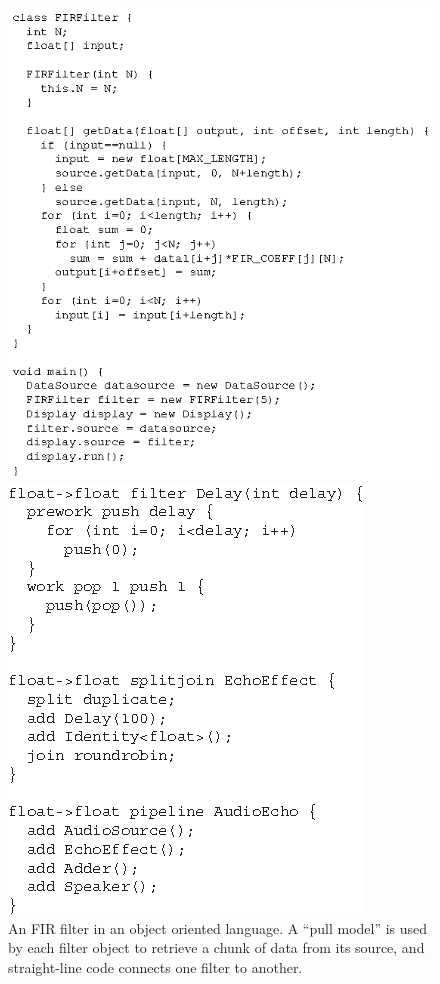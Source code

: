 \begin{figure}
\centering
\includegraphics{fir-object.eps}
\vspace{-6pt}
\caption{An FIR filter in an object oriented language.  A ``pull
  model'' is used by each filter object to retrieve a chunk of data
  from its source, and straight-line code connects one filter to
  another.}
\label{fig:firobject}
\vspace{6pt}
\includegraphics{echo.eps}

\end{figure}
